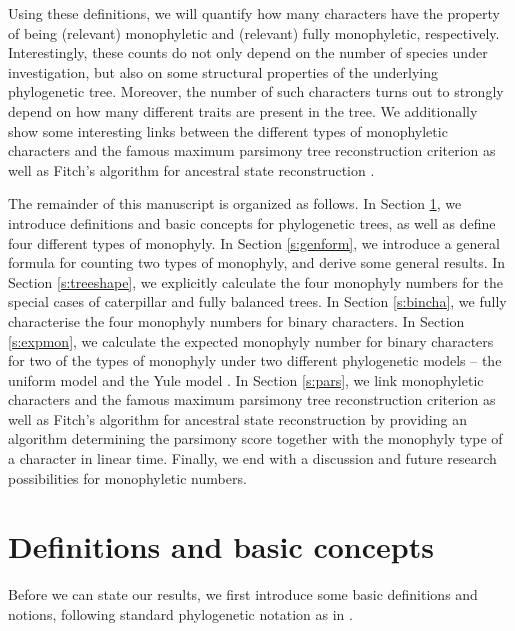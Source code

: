 \documentclass{amsart}
\theoremstyle{definition}
\begin{document}
Using these definitions, we will quantify how many characters have the property of being (relevant) monophyletic and (relevant) fully monophyletic, respectively. Interestingly, these counts do not only depend on the number of species under investigation, but also on some structural properties of the underlying phylogenetic tree. Moreover, the number of such characters turns out to strongly depend on how many different traits are present in the tree. We additionally show some interesting links between the different types of monophyletic characters and the famous maximum parsimony tree reconstruction criterion as well as Fitch's algorithm for ancestral state reconstruction \cite{Fitch,Hartigan1973}.

The remainder of this manuscript is organized as follows. In Section \ref{s:defbas}, we introduce definitions and basic concepts for phylogenetic trees, as well as define four different types of monophyly. In Section \ref{s:genform}, we introduce a general formula for counting two types of monophyly, and derive some general results. In Section \ref{s:treeshape}, we explicitly calculate the four monophyly numbers for the special cases of caterpillar and fully balanced trees. In Section \ref{s:bincha}, we fully characterise the four monophyly numbers for binary characters. In Section \ref{s:expmon}, we calculate the expected monophyly number for binary characters for two of the types of monophyly under two different phylogenetic models -- the uniform model \cite{Semple2003} and the Yule model \cite{yule}. In Section \ref{s:pars}, we link monophyletic characters and the famous maximum parsimony tree reconstruction criterion as well as Fitch's algorithm for ancestral state reconstruction by providing an algorithm determining the parsimony score together with the monophyly type of a character in linear time. Finally, we end with a discussion and future research possibilities for monophyletic numbers.

\section{Definitions and basic concepts}\label{s:defbas}

Before we can state our results, we first introduce some basic definitions and notions, following standard phylogenetic notation as in \cite{Semple2003, Steel2016,fischer_tree_2023}.
\end{document}

